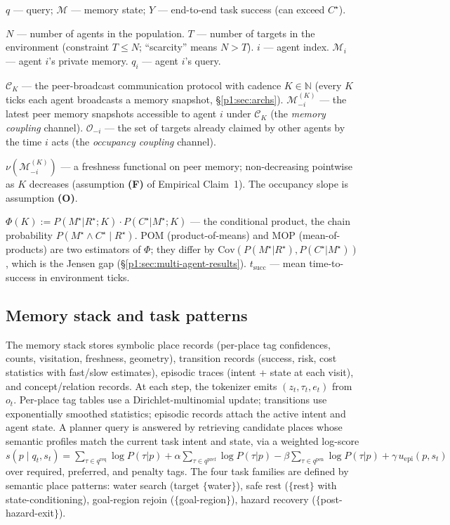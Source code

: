 \documentclass{article}
\begin{document}
$q$ --- query; $\mathcal{M}$ --- memory state; $Y$ --- end-to-end task success (can exceed $C^\star$).

$N$ --- number of agents in the population. $T$ --- number of targets in the environment (constraint $T \le N$; ``scarcity'' means $N > T$). $i$ --- agent index. $\mathcal{M}_i$ --- agent $i$'s private memory. $q_i$ --- agent $i$'s query.

$\mathcal{C}_K$ --- the peer-broadcast communication protocol with cadence $K \in \mathbb{N}$ (every $K$ ticks each agent broadcasts a memory snapshot, \S\ref{p1:sec:archs}). $\mathcal{M}_{-i}^{(K)}$ --- the latest peer memory snapshots accessible to agent $i$ under $\mathcal{C}_K$ (the \emph{memory coupling} channel). $\mathcal{O}_{-i}$ --- the set of targets already claimed by other agents by the time $i$ acts (the \emph{occupancy coupling} channel).

$\nu(\mathcal{M}_{-i}^{(K)})$ --- a freshness functional on peer memory; non-decreasing pointwise as $K$ decreases (assumption \textbf{(F)} of Empirical Claim~1). The occupancy slope is assumption \textbf{(O)}.

$\Phi(K) := P(M^\star|R^\star;K)\cdot P(C^\star|M^\star;K)$ --- the conditional product, the chain probability $P(M^\star \land C^\star \mid R^\star)$. POM (product-of-means) and MOP (mean-of-products) are two estimators of $\Phi$; they differ by $\mathrm{Cov}(P(M^\star|R^\star), P(C^\star|M^\star))$, which is the Jensen gap (\S\ref{p1:sec:multi-agent-results}). $t_{\mathrm{succ}}$ --- mean time-to-success in environment ticks.
\par\smallskip

\subsection{Memory stack and task patterns}

The memory stack stores symbolic place records (per-place tag confidences, counts, visitation, freshness, geometry), transition records (success, risk, cost statistics with fast/slow estimates), episodic traces (intent + state at each visit), and concept/relation records. At each step, the tokenizer emits $(z_t, \tau_t, e_t)$ from $o_t$. Per-place tag tables use a Dirichlet-multinomial update; transitions use exponentially smoothed statistics; episodic records attach the active intent and agent state. A planner query is answered by retrieving candidate places whose semantic profiles match the current task intent and state, via a weighted log-score
$s(p \mid q_t, s_t) = \sum_{\tau \in q^{\mathrm{req}}} \log P(\tau|p)
+ \alpha \sum_{\tau \in q^{\mathrm{pref}}} \log P(\tau|p)
- \beta \sum_{\tau \in q^{\mathrm{pen}}} \log P(\tau|p)
+ \gamma\, u_{\mathrm{epi}}(p, s_t)$
over required, preferred, and penalty tags. The four task families are defined by semantic place patterns: water search (target $\{$water$\}$), safe rest ($\{$rest$\}$ with state-conditioning), goal-region rejoin ($\{$goal-region$\}$), hazard recovery ($\{$post-hazard-exit$\}$).
\end{document}
